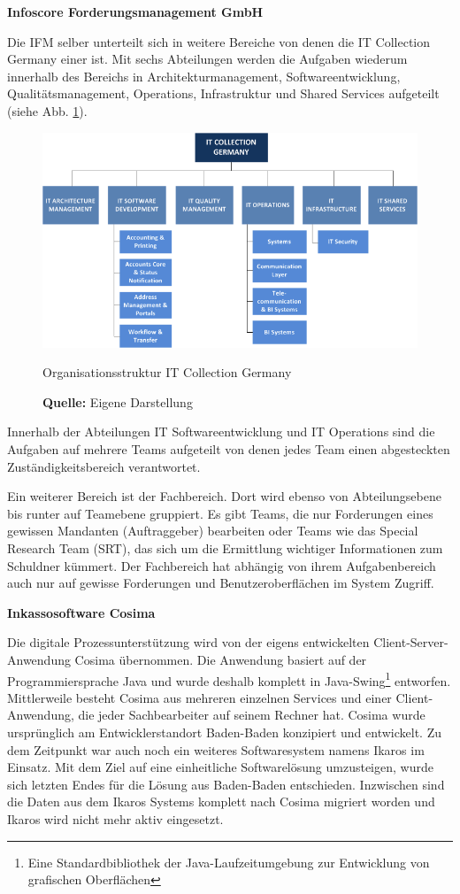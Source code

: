 \textbf{Infoscore Forderungsmanagement GmbH}

Die \gls{IFM} selber unterteilt sich in weitere Bereiche von denen die IT Collection Germany einer ist. Mit sechs Abteilungen werden die Aufgaben wiederum innerhalb des Bereichs in Architekturmanagement, Softwareentwicklung, Qualitätsmanagement, Operations, Infrastruktur und Shared Services aufgeteilt (siehe Abb. \ref{fig:organisationsstruktur}).
\begin{figure}[H]
  \centering
  \includegraphics[scale=0.78]{img/IT_Collection_Germany_Organisation.png}
  \caption{Organisationsstruktur IT Collection Germany}
  \caption*{\textbf{Quelle:} Eigene Darstellung}
  \label{fig:organisationsstruktur}
\end{figure}
Innerhalb der Abteilungen IT Softwareentwicklung und IT Operations sind die Aufgaben auf mehrere Teams aufgeteilt von denen jedes Team einen abgesteckten Zuständigkeitsbereich verantwortet.

Ein weiterer Bereich ist der Fachbereich. Dort wird ebenso von Abteilungsebene bis runter auf Teamebene gruppiert. Es gibt Teams, die nur Forderungen eines gewissen Mandanten (Auftraggeber) bearbeiten oder Teams wie das Special Research Team (SRT), das sich um die Ermittlung wichtiger Informationen zum Schuldner kümmert. Der Fachbereich hat abhängig von ihrem Aufgabenbereich auch nur auf gewisse Forderungen und Benutzeroberflächen im System Zugriff.

\pagebreak
\textbf{Inkassosoftware Cosima}

Die digitale Prozessunterstützung wird von der eigens entwickelten Client-Server-Anwendung Cosima übernommen. Die Anwendung basiert auf der Programmiersprache Java und wurde deshalb komplett in Java-Swing\footnote{Eine Standardbibliothek der Java-Laufzeitumgebung zur Entwicklung von grafischen Oberflächen} entworfen. Mittlerweile besteht Cosima aus mehreren einzelnen Services und einer Client-Anwendung, die jeder Sachbearbeiter auf seinem Rechner hat. Cosima wurde ursprünglich am Entwicklerstandort Baden-Baden konzipiert und entwickelt. Zu dem Zeitpunkt war auch noch ein weiteres Softwaresystem namens Ikaros im Einsatz. Mit dem Ziel auf eine einheitliche Softwarelösung umzusteigen, wurde sich letzten Endes für die Lösung aus Baden-Baden entschieden. Inzwischen sind die Daten aus dem Ikaros Systems komplett nach Cosima migriert worden und Ikaros wird nicht mehr aktiv eingesetzt.

